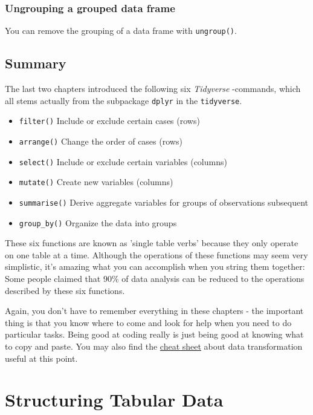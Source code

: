 \documentclass[
]{scrartcl}
\begin{document}
\hypertarget{ungrouping-a-grouped-data-frame}{%
\subsubsection*{Ungrouping a grouped data frame}\label{ungrouping-a-grouped-data-frame}}

You can remove the grouping of a data frame with \texttt{ungroup()}.

\hypertarget{summary}{%
\subsection{Summary}\label{summary}}

The last two chapters introduced the following six \emph{Tidyverse} -commands, which all stems actually from the subpackage \texttt{dplyr} in the \texttt{tidyverse}.

\begin{itemize}
\item
  \texttt{filter()} Include or exclude certain cases (rows)
\item
  \texttt{arrange()} Change the order of cases (rows)
\item
  \texttt{select()} Include or exclude certain variables (columns)
\item
  \texttt{mutate()} Create new variables (columns)
\item
  \texttt{summarise()} Derive aggregate variables for groups of observations
  subsequent
\item
  \texttt{group\_by()} Organize the data into groups
\end{itemize}

These six functions are known as 'single table verbs' because they only operate on one table at a time. Although the operations of these functions may seem very simplistic, it's amazing what you can accomplish when you string them together: Some people claimed that 90\% of data analysis can be reduced to the operations described by these six functions.

Again, you don't have to remember everything in these chapters - the important thing is that you know where to come and look for help when you need to do particular tasks. Being good at coding really is just being good at knowing what to copy and paste. You may also find the \protect\hyperlink{cheatsheets}{cheat sheet} about data transformation useful at this point.

\hypertarget{structuring-tabular-data}{%
\section{Structuring Tabular Data}\label{structuring-tabular-data}}
\end{document}
